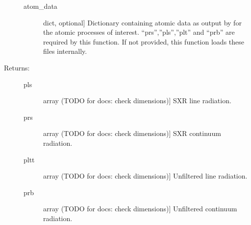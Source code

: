 \documentclass[letterpaper,10pt,english]{sphinxmanual}
\begin{document}
\begin{fulllineitems}
\begin{description}
\begin{description}
\item[{atom\_data}] \leavevmode{[}dict, optional{]}
Dictionary containing atomic data as output by {\hyperref[\detokenize{aurora:aurora.atomic.get_atom_data}]{}}
for the atomic processes of interest. “prs”,”pls”,”plt” and “prb” are required by this function.
If not provided, this function loads these files internally.

\end{description}

\item[{Returns:}] \leavevmode\begin{description}
\item[{pls}] \leavevmode{[}array (TODO for docs: check dimensions){]}
SXR line radiation.

\item[{prs}] \leavevmode{[}array (TODO for docs: check dimensions){]}
SXR continuum radiation.

\item[{pltt}] \leavevmode{[}array (TODO for docs: check dimensions){]}
Unfiltered line radiation.

\item[{prb}] \leavevmode{[}array (TODO for docs: check dimensions){]}
Unfiltered continuum radiation.

\end{description}

\end{description}

\end{fulllineitems}

\end{document}
